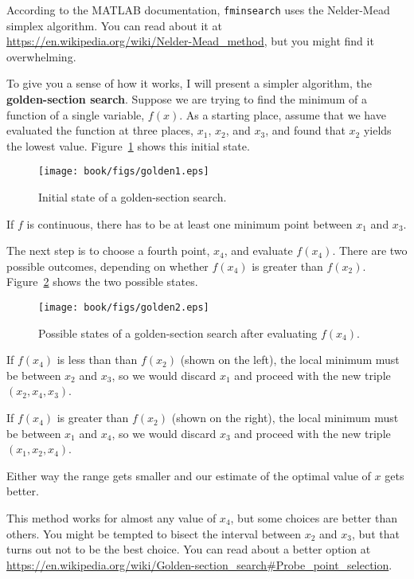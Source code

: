 \documentclass[main.tex]{subfiles}
\begin{document}
According to the MATLAB documentation, {\tt fminsearch} uses the Nelder-Mead simplex algorithm.  You can read about it at \url{https://en.wikipedia.org/wiki/Nelder-Mead_method}, but you might find it 
overwhelming.


To give you a sense of how it works, I will present a simpler algorithm, the {\bf golden-section search}.  Suppose we are trying to find the minimum of a function of a single variable, $f(x)$.  As a starting place, assume that we have evaluated the function at three places, 
$x_1$, $x_2$, and $x_3$, and found that $x_2$ yields the lowest
value. Figure~\ref{fig:golden1} shows this initial state.

\begin{figure}
\centerline{\texttt{[image: book/figs/golden1.eps]}}
\caption{Initial state of a golden-section search.}
\label{fig:golden1}
\end{figure}

If $f$ is continuous, there has to be at least one
minimum point between $x_1$ and $x_3$.


The next step is to choose a fourth point, $x_4$, and evaluate
$f(x_4)$.  There are two possible outcomes, depending on whether
$f(x_4)$ is greater than $f(x_2)$.
Figure~\ref{fig:golden2} shows the two possible states.

\begin{figure}
\centerline{\texttt{[image: book/figs/golden2.eps]}}
\caption{Possible states of a golden-section search after evaluating $f(x_4)$.}
\label{fig:golden2}
\end{figure}

If $f(x_4)$ is less than than $f(x_2)$ (shown on the left), the
local minimum must be between $x_2$ and $x_3$, so we would discard $x_1$ and proceed with the new triple $(x_2, x_4, x_3)$.

If $f(x_4)$ is greater than $f(x_2)$ (shown on the right), the
local minimum must be between $x_1$ and $x_4$, so we would discard $x_3$ and proceed with the new triple $(x_1, x_2, x_4)$.

Either way the range gets smaller and our estimate of the optimal value of $x$ gets better.

This method works for almost any value of $x_4$, but some choices
are better than others.  You might be tempted to bisect the interval between $x_2$ and $x_3$, but that turns out not to be the best choice.  You can read about a better option at \url{https://en.wikipedia.org/wiki/Golden-section_search#Probe_point_selection}.
\end{document}
